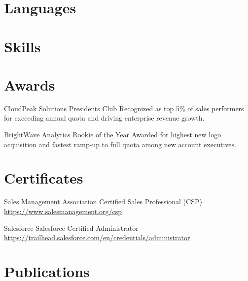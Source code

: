 \documentclass[a4paper, serif, 10pt]{moderncv}
\begin{document}
\section{Languages}

\section{Skills}

\section{Awards}

        {CloudPeak Solutions}
        {Presidents Club}
        {}
        {}
        {Recognized as top 5\% of sales performers for exceeding annual quota and driving enterprise revenue growth.}

        {BrightWave Analytics}
        {Rookie of the Year}
        {}
        {}
        {Awarded for highest new logo acquisition and fastest ramp-up to full quota among new account executives.}
\section{Certificates}

        {Sales Management Association}
        {Certified Sales Professional (CSP)}
        {\url{https://www.salesmanagement.org/csp}}
        {}
        {}

        {Salesforce}
        {Salesforce Certified Administrator}
        {\url{https://trailhead.salesforce.com/en/credentials/administrator}}
        {}
        {}
\section{Publications}
\end{document}
